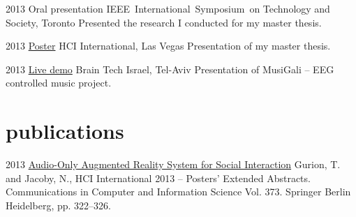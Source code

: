 \documentclass[]{friggeri-cv}  %
\begin{document}
\begin{entrylist}

    \entry
    {2013}
    {Oral presentation}
    {IEEE International Symposium on Technology and Society, Toronto}
    {Presented the research I conducted for my master thesis.}

\end{entrylist}
\begin{entrylist}

    \entry
    {2013}
    {\href{https://db.tt/Rx7FnAxn}{Poster}}
    {HCI International, Las Vegas}
    {Presentation of my master thesis.}

\end{entrylist}
\begin{entrylist}

    \entry
    {2013}
    {\href{http://tomgurion.blogspot.co.il/2013/10/musigali-eeg-controlled-music-for-brain.html}{Live demo}}
    {Brain Tech Israel, Tel-Aviv}
    {Presentation of MusiGali -- EEG controlled music project.}

\end{entrylist}


\section{publications}

\begin{entrylist}

    \entry
    {2013}
    {\href{http://db.tt/zpgwMFKJ}{Audio-Only Augmented Reality System for Social Interaction}}
    {}
    {Gurion, T. and Jacoby, N., HCI International 2013 -- Posters’ Extended Abstracts. Communications in Computer and Information Science Vol. 373. Springer Berlin Heidelberg, pp. 322–326.}

\end{entrylist}
\end{document}
